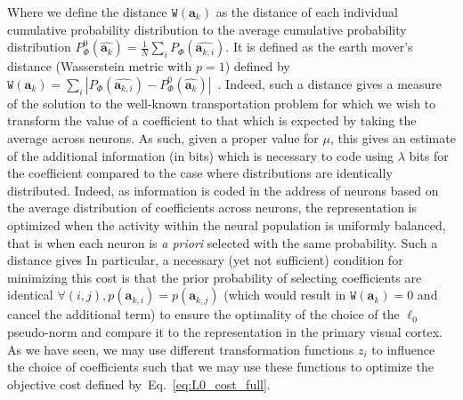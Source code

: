 \documentclass[vision,article,submit,oneauthor,pdftex]{Definitions/mdpi}
\newcommand{\coef}{\mathbf{a}} %
\newcommand{\image}{\mathbf{y}} %
\newcommand{\dico}{\Phi} %
\newcommand{\seeEq}[1]{Eq.~\ref{eq:#1}}%
\begin{document}
Where we define the distance $\texttt{W}(\coef_{k})$ as the distance of each individual cumulative probability distribution to the average cumulative probability distribution $P^0_\dico(\hat{\coef_{k}}) = \frac 1 N \sum_i P_\dico(\hat{\coef_{k,i}})$. It is defined as the earth mover's distance (Wasserstein metric with $p=1$) defined by $ \texttt{W}(\coef_{k}) = \sum_i | P_\dico(\hat{\coef_{k,i}}) - P^0_\dico(\hat{\coef_{k}})|$~\citep{Vallender74}. Indeed, such a distance gives a measure of the solution to the well-known transportation problem for which we wish to transform the value of a coefficient to that which is expected by taking the average across neurons. As such, given a proper value for $\mu$, this gives an estimate of the additional information (in bits) which is necessary to code using $\lambda$ bits for the coefficient compared to the case where distributions are identically distributed. %
Indeed, as information is coded in the address of neurons based on the average distribution of coefficients across neurons, the representation is optimized when the activity within the neural population is uniformly balanced, that is when each neuron is \emph{a priori} selected with the same probability. Such a distance gives 
 In particular, a necessary (yet not sufficient) condition for minimizing this cost is that the prior probability of selecting coefficients are identical $\forall (i,j), p(\coef_{k,i})=p(\coef_{k,j})$ (which would result in $\texttt{W}(\coef_{k})= 0$ and cancel the additional term) to ensure the optimality of the choice of the $\ell_0$ pseudo-norm and compare it to the representation in the primary visual cortex. As we have seen, we may use different transformation functions $z_i$ to influence the choice of coefficients such that we may use these functions to optimize the objective cost defined by~\seeEq{L0_cost_full}. 
\end{document}
